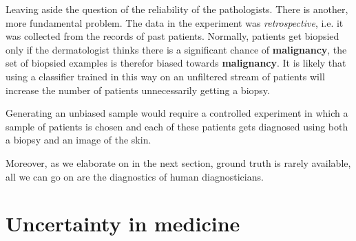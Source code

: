 \documentclass[11pt]{pnas-new}
\begin{document}
Leaving aside the question of the reliability of the
pathologists. There is another, more fundamental problem. The data
in the experiment was {\em retrospective}, i.e. it was collected from
the records of past patients. Normally, patients get
biopsied only if the dermatologist thinks there is a significant chance of
{\bf malignancy}, the set of biopsied examples is therefor biased towards
{\bf malignancy}. It is likely that using a classifier trained in this way
on an unfiltered stream of patients will increase the number of
patients unnecessarily getting a biopsy.

Generating an unbiased sample would require a controlled experiment in
which a sample of patients is chosen and each of these patients gets
diagnosed using both a biopsy and an image of the skin.


Moreover, as we elaborate on in the next section, ground truth is
rarely available, all we can go on are the diagnostics of human diagnosticians.

\section{Uncertainty in medicine}
\end{document}
